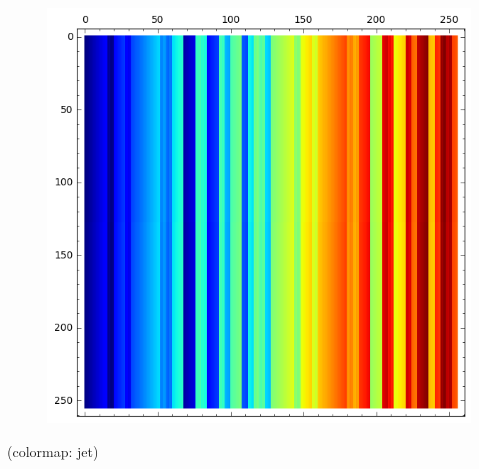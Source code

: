 \documentclass[pdf,sprung,slideColor,nocolorBG]{beamer}
\newenvironment{colortheme}[1]{
\def\ProvidesPackageRCS $##1${\relax}
\renewcommand{\ProcessOptions}{\relax}
\makeatletter

\makeatother
}{}
\newcommand{\slidecite}[1]{\tiny{(#1)}\normalsize{}}
\begin{document}
\begin{colortheme}{jubata}
\begin{frame}
\begin{figure}
\begin{minipage}{.48\textwidth}
\includegraphics[width=.9\linewidth]{../matrix_plot/cast128_2_16_bent_cayley_graph_index_matrix.png}
  \label{fig:cast128_2_16_bent_cayley_graph_index_matrix}
\end{minipage}%
\end{figure}
\slidecite{colormap: jet}
\end{frame}


\end{colortheme}
\end{document}
